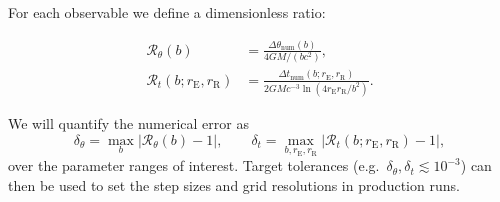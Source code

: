 \documentclass[11pt]{article}
\begin{document}
For each observable we define a dimensionless ratio:

\begin{align}
  \mathcal{R}_\theta(b)
  &= \frac{\Delta\theta_\mathrm{num}(b)}
          {4GM/(b c^2)},\\[0.5ex]
  \mathcal{R}_t(b; r_\mathrm{E}, r_\mathrm{R})
  &= \frac{\Delta t_\mathrm{num}(b; r_\mathrm{E}, r_\mathrm{R})}
          {2GM c^{-3}\ln(4 r_\mathrm{E} r_\mathrm{R}/b^2)}.
\end{align}

We will quantify the numerical error as
\begin{equation}
  \delta_\theta
  = \max_b\bigl|\mathcal{R}_\theta(b) - 1\bigr|,
  \qquad
  \delta_t
  = \max_{b,r_\mathrm{E},r_\mathrm{R}}
      \bigl|\mathcal{R}_t(b; r_\mathrm{E}, r_\mathrm{R}) - 1\bigr|,
\end{equation}
over the parameter ranges of interest.
Target tolerances (e.g.\ $\delta_\theta,\delta_t \lesssim 10^{-3}$) can
then be used to set the step sizes and grid resolutions in production
runs.
\end{document}
